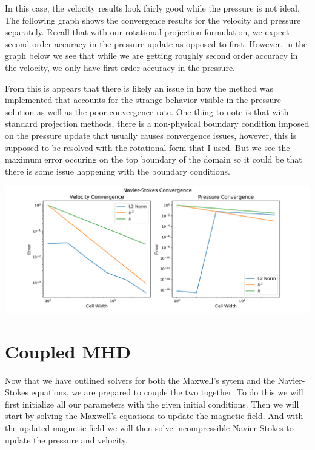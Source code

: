 \documentclass{article}
\begin{document}
                In this case, the velocity results look fairly good while the pressure is not ideal. The following graph shows the convergence results for the velocity and pressure separately. Recall that with our rotational projection formulation, we expect second order accuracy in the pressure update as opposed to first. However, in the graph below we see that while we are getting roughly second order accuracy in the velocity, we only have first order accuracy in the pressure. 

                From this is appears that there is likely an issue in how the method was implemented that accounts for the strange behavior visible in the pressure solution as well as the poor convergence rate. One thing to note is that with standard projection methods, there is a non-physical boundary condition imposed on the pressure update that usually causes convergence issues, however, this is supposed to be resolved with the rotational form that I used. But we see the maximum error occuring on the top boundary of the domain so it could be that there is some issue happening with the boundary conditions.

                \begin{center}
                \includegraphics[scale=.6]{presentation/ns_conv.png}
                \end{center}

   \section*{Coupled MHD}

   Now that we have outlined solvers for both the Maxwell's sytem and the Navier-Stokes equations, we are prepared to couple the two together. To do this we will first initialize all our parameters with the given initial conditions. Then we will start by solving the Maxwell's equations to update the magnetic field. And with the updated magnetic field we will then solve incompressible Navier-Stokes to update the pressure and velocity. 
\end{document}
